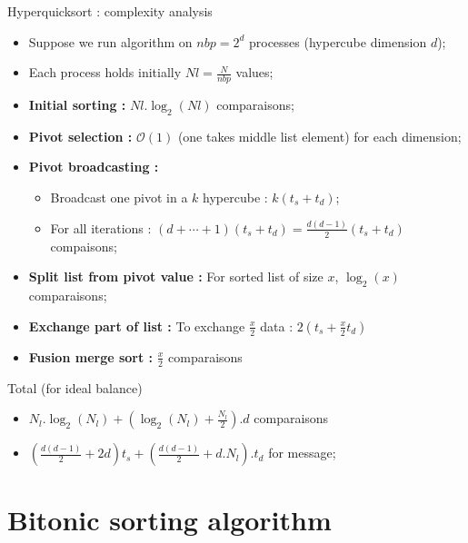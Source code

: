 \documentclass[compress,10pt,aspectratio=169]{beamer}
\begin{document}
\begin{frame}[fragile]{Hyperquicksort : complexity analysis}
    \scriptsize
    \begin{itemize}
        \item Suppose we run algorithm on $nbp=2^{d}$ processes (hypercube dimension $d$);
        \item Each process holds initially $Nl=\frac{N}{nbp}$ values;
        \item \textbf{Initial sorting : } $Nl.\log_{2}(Nl)$ comparaisons;
        \item \textbf{Pivot selection : } $\mathcal{O}(1)$ (one takes middle list element) for each dimension;
        \item \textbf{Pivot broadcasting : }
        \begin{itemize}
            \item {\scriptsize Broadcast one pivot in a $k$ hypercube :  $k(t_{s}+t_{d})$;}
            \item {\scriptsize For all iterations : $(d+\cdots+1)(t_{s}+t_{d}) = \frac{d(d-1)}{2}(t_{s}+t_{d})$ compaisons;}
        \end{itemize}
        \item \textbf{Split list from pivot value : } For sorted list of size $x$, $\log_{2}(x)$ comparaisons;
        \item \textbf{Exchange part of list : } To exchange $\frac{x}{2}$ data : $2(t_{s}+\frac{x}{2}t_{d})$
        \item \textbf{Fusion merge sort : } $\frac{x}{2}$ comparaisons
    \end{itemize}

    \begin{alertblock}{\small Total (for ideal balance)}
        \begin{itemize}
            \item $N_{l}.\log_{2}(N_{l})+\left(\log_{2}(N_{l}) + \frac{N_{l}}{2}\right).d$ comparaisons
            \item $\left(\frac{d(d-1)}{2}+2d\right)t_{s} + \left(\frac{d(d-1)}{2}+d.N_{l}\right).t_{d}$ for message;
        \end{itemize}
    \end{alertblock}
\end{frame}

\section{Bitonic sorting algorithm}
\end{document}
